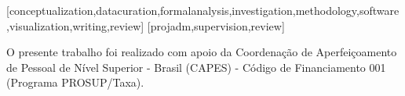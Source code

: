 \documentclass[portuguese]{textolivre}
\begin{document}
\printbibliography\label{sec-bib}


\begin{contributors}
[conceptualization,datacuration,formalanalysis,investigation,methodology,software,visualization,writing,review]
[projadm,supervision,review]
\end{contributors}

\begin{dataavailability}
\end{dataavailability}

\begin{funding}
O presente trabalho foi realizado com apoio da Coordenação de Aperfeiçoamento de Pessoal de Nível Superior - Brasil (CAPES) - Código de Financiamento 001 (Programa PROSUP/Taxa).
\end{funding}
\end{document}

